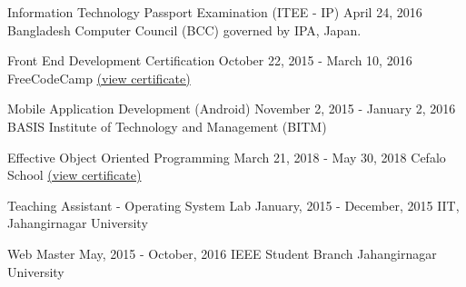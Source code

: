 \cvcertificate
{Information Technology Passport Examination (ITEE - IP)}
{April 24, 2016}
{Bangladesh Computer Council (BCC) governed by IPA, Japan.}
\divider

\cvcertificate
{Front End Development Certification}
{October 22, 2015 - March 10, 2016}
{FreeCodeCamp \href{https://www.freecodecamp.org/certification/arsho/legacy-front-end}{(view certificate)}}
\divider

\cvcertificate
{Mobile Application Development (Android)}
{November 2, 2015 - January 2, 2016}
{BASIS Institute of Technology and Management (BITM)}

\divider

\cvcertificate
{Effective Object Oriented Programming}
{March 21, 2018 - May 30, 2018}
{Cefalo School \href{https://school.cefalolab.com/20181104.pdf}{(view certificate)}}

\medskip

\cvcertificate
{Teaching Assistant - Operating System Lab}
{January, 2015 - December, 2015}
{IIT, Jahangirnagar University}
\divider

\cvcertificate
{Web Master}
{May, 2015 - October, 2016}
{IEEE Student Branch Jahangirnagar University}
\divider

\medskip


